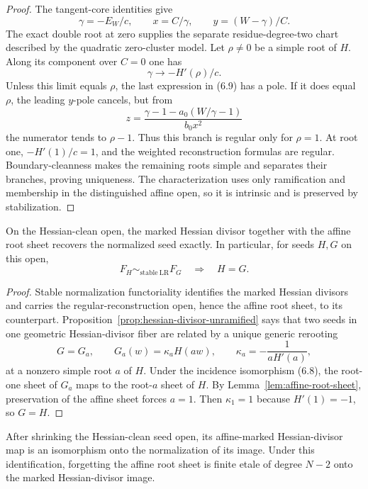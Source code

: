 \begin{proof}
The tangent-core identities give
\[
 \gamma=-E_W/c,\qquad x=C/\gamma,
 \qquad y=(W-\gamma)/C.                               \tag{6.9}
\]
The exact double root at zero supplies the separate residue-degree-two chart
described by the quadratic zero-cluster model.  Let $\rho\ne0$ be a simple
root of $H$.  Along its component over $C=0$ one has
\[
 \gamma\longrightarrow-H'(\rho)/c.
\]
Unless this limit equals $\rho$, the last expression in (6.9) has a pole.
If it does equal $\rho$, the leading $y$-pole cancels, but from
\[
 z=\frac{\gamma-1-a_0(W/\gamma-1)}{b_0x^2}            \tag{6.10}
\]
the numerator tends to $\rho-1$.  Thus this branch is regular only for
$\rho=1$.  At root one, $-H'(1)/c=1$, and the weighted reconstruction
formulas are regular.  Boundary-cleanness makes the remaining roots simple
and separates their branches, proving uniqueness.  The characterization uses
only ramification and membership in the distinguished affine open, so it is
intrinsic and is preserved by stabilization.
\end{proof}

\begin{theorem}
\label{thm:affine-mark-faithful}
On the Hessian-clean open, the marked Hessian divisor together with the
affine root sheet recovers the normalized seed exactly.  In
particular, for seeds $H,G$ on this open,
\[
 F_H\sim_{\mathrm{stable\ LR}}F_G\quad\Longrightarrow\quad H=G.        \tag{6.11}
\]
\end{theorem}

\begin{proof}
Stable normalization functoriality identifies the marked Hessian divisors
and carries the regular-reconstruction open, hence the affine root sheet, to
its counterpart.  Proposition~\ref{prop:hessian-divisor-unramified} says that two
seeds in one geometric Hessian-divisor fiber are related by a unique generic
rerooting
\[
 G=G_a,\qquad G_a(w)=\kappa_aH(aw),
 \qquad \kappa_a=-\frac1{aH'(a)},                    \tag{6.12}
\]
at a nonzero simple root $a$ of $H$.  Under the incidence isomorphism (6.8),
the root-one sheet of $G_a$ maps to the root-$a$ sheet of $H$.  By
Lemma~\ref{lem:affine-root-sheet}, preservation of the affine sheet forces
$a=1$.  Then $\kappa_1=1$ because $H'(1)=-1$, so $G=H$.
\end{proof}

\begin{theorem}
\label{thm:marked-moduli-normalization}
After shrinking the Hessian-clean seed open, its affine-marked
Hessian-divisor map is an isomorphism onto the normalization of its image.
Under this
identification, forgetting the affine root sheet is finite etale of degree
$N-2$ onto the marked Hessian-divisor image.
\end{theorem}

